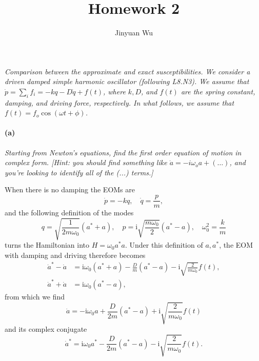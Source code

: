 \documentclass[hyperref, a4paper]{article}
\title{Homework 2}
\author{Jinyuan Wu}
\newcommand*{\ii}{\mathrm{i}}
\begin{document}
\maketitle

\section{}

\subsection{}

\textit{Comparison between the approximate and exact susceptibilities. We consider a driven damped simple harmonic oscillator (following L8.N3). We assume that $\dot{p}=\sum_i f_i=-k q-D \dot{q}+f(t)$, where $k, D$, and $f(t)$ are the spring constant, damping, and driving force, respectively. In what follows, we assume that $f(t)=f_o \cos (\omega t+\phi)$.
}

\paragraph*{(a)} \textit{Starting from Newton's equations, find the first order equation of motion in complex form. [Hint: you should find something like $\dot{a}=-i \omega_o a+(\ldots)$, and you're looking to identify all of the (...) terms.]} 

When there is no damping the EOMs are 
\begin{equation}
    \dot{p} = - k q, \quad \dot{q} = \frac{p}{m}, 
\end{equation}
and the following definition of the modes 
\begin{equation}
    q = \sqrt{\frac{1}{2 m \omega_0}} (a^* + a), \quad 
    p = \ii \sqrt{\frac{m \omega_0}{2}} (a^* - a), \quad 
    \omega_0^2 = \frac{k}{m} 
\end{equation} 
turns the Hamiltonian into $H = \omega_0 a^* a$.
Under this definition of $a, a^*$,
the EOM with damping and driving therefore becomes 
\begin{equation}
    \begin{aligned}
        \dot{a}^* - \dot{a} &= \ii \omega_0 (a^* + a) - \frac{D}{m} (a^* - a) - \ii \sqrt{\frac{2}{m \omega_0}} f(t), \\ 
        \dot{a}^* + \dot{a} &= \ii \omega_0 (a^* - a),
    \end{aligned}
\end{equation}
from which we find 
\begin{equation}
    \dot{a} = - \ii \omega_0 a + \frac{D}{2m} (a^* - a) + \ii \sqrt{\frac{2}{m \omega_0}} f(t)
\end{equation}
and its complex conjugate 
\begin{equation}
    \dot{a}^* = \ii \omega_0 a^* - \frac{D}{2m} (a^* - a) - \ii \sqrt{\frac{2}{m \omega_0}} f(t).
\end{equation}
\end{document}
